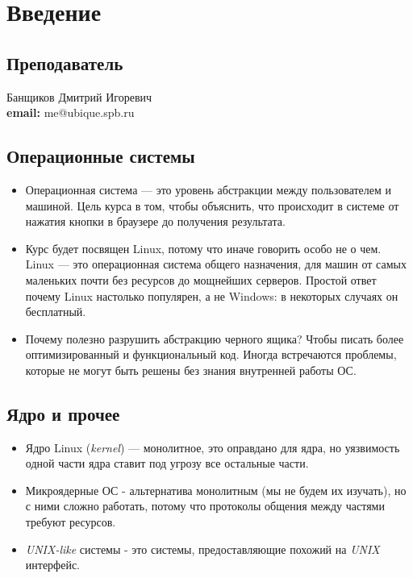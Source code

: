 \documentclass[../../lectures.tex]{subfiles}
\begin{document}
\chapter{Введение}

\section{Преподаватель}
Банщиков Дмитрий Игоревич\\
\textbf{email:} me@ubique.spb.ru

\section{Операционные системы}
\begin{itemize}
    \item Операционная система --- это уровень абстракции между пользователем и машиной.
    Цель курса в том, чтобы объяснить, что происходит в системе от нажатия кнопки в
    браузере до получения результата.

    \item Курс будет посвящен Linux, потому что иначе говорить особо не о чем. Linux ---
    это операционная система общего назначения, для машин от самых маленьких почти
    без ресурсов до мощнейших серверов. Простой ответ почему Linux настолько
    популярен, а не Windows: в некоторых случаях он бесплатный.

    \item Почему полезно разрушить абстракцию черного ящика? Чтобы писать более
    оптимизированный и функциональный код. Иногда встречаются проблемы, которые не
    могут быть решены без знания внутренней работы ОС.
\end{itemize}

\section{Ядро и прочее}
\begin{itemize}
    \item Ядро Linux (\emph{kernel}) --- монолитное, это оправдано для ядра, но уязвимость одной части ядра
    ставит под угрозу все остальные части.

    \item Микроядерные ОС - альтернатива монолитным (мы не будем их изучать), но с ними
    сложно работать, потому что протоколы общения между частями требуют ресурсов.

    \item \emph{UNIX-like} системы - это системы, предоставляющие похожий на \emph{UNIX} интерфейс.
\end{itemize}
\end{document}
